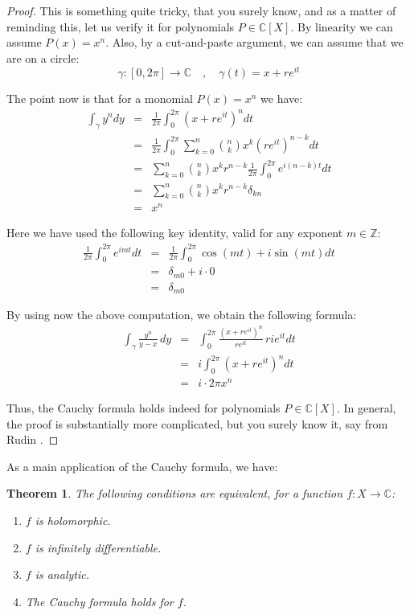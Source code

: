 \documentclass[12pt]{amsbook}
\newtheorem{theorem}{Theorem}[chapter]
\begin{document}
\begin{proof}
This is something quite tricky, that you surely know, and as a matter of reminding this, let us verify it for polynomials $P\in\mathbb C[X]$. By linearity we can assume $P(x)=x^n$. Also, by a cut-and-paste argument, we can assume that we are on a circle:
$$\gamma:[0,2\pi]\to\mathbb C\quad,\quad \gamma(t)=x+re^{it}$$

The point now is that for a monomial $P(x)=x^n$ we have:
\begin{eqnarray*}
\int_\gamma y^ndy
&=&\frac{1}{2\pi}\int_0^{2\pi}(x+re^{it})^ndt\\
&=&\frac{1}{2\pi}\int_0^{2\pi}\sum_{k=0}^n\binom{n}{k}x^k(re^{it})^{n-k}dt\\
&=&\sum_{k=0}^n\binom{n}{k}x^kr^{n-k}\frac{1}{2\pi}\int_0^{2\pi}e^{i(n-k)t}dt\\
&=&\sum_{k=0}^n\binom{n}{k}x^kr^{n-k}\delta_{kn}\\
&=&x^n
\end{eqnarray*}

Here we have used the following key identity, valid for any exponent $m\in\mathbb Z$:
\begin{eqnarray*}
\frac{1}{2\pi}\int_0^{2\pi}e^{imt}dt
&=&\frac{1}{2\pi}\int_0^{2\pi}\cos(mt)+i\sin(mt)dt\\
&=&\delta_{m0}+i\cdot 0\\
&=&\delta_{m0}
\end{eqnarray*}

By using now the above computation, we obtain the following formula:
\begin{eqnarray*}
\int_\gamma\frac{y^n}{y-x}\,dy
&=&\int_0^{2\pi}\frac{(x+re^{it})^n}{re^{it}}\,rie^{it}dt\\
&=&i\int_0^{2\pi}(x+re^{it})^ndt\\
&=&i\cdot 2\pi x^n
\end{eqnarray*}

Thus, the Cauchy formula holds indeed for polynomials $P\in\mathbb C[X]$. In general, the proof is substantially more complicated, but you surely know it, say from Rudin \cite{ru2}.
\end{proof}

As a main application of the Cauchy formula, we have:


\begin{theorem}
The following conditions are equivalent, for a function $f:X\to\mathbb C$:
\begin{enumerate}
\item $f$ is holomorphic.

\item $f$ is infinitely differentiable.

\item $f$ is analytic.

\item The Cauchy formula holds for $f$.
\end{enumerate}
\end{theorem}
\end{document}
